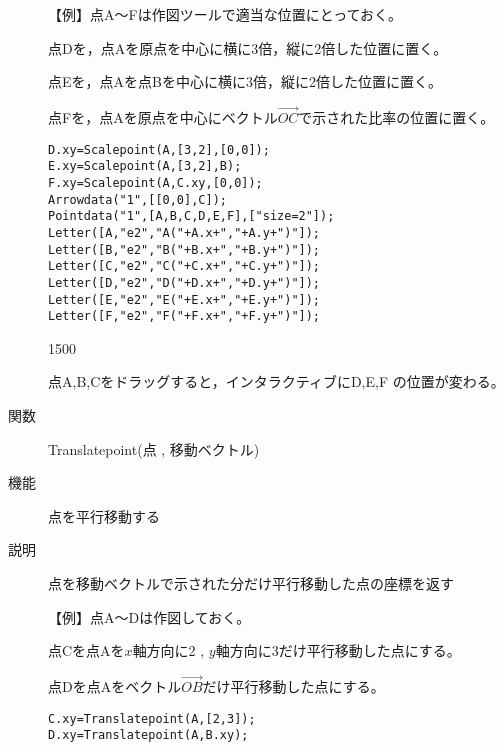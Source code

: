 \documentclass[papersize,a4paper,10pt,uplatex]{jsarticle}
\begin{document}
\begin{description}
\vspace{3mm}

【例】点A〜Fは作図ツールで適当な位置にとっておく。

点Dを，点Aを原点を中心に横に3倍，縦に2倍した位置に置く。

点Eを，点Aを点Bを中心に横に3倍，縦に2倍した位置に置く。

点Fを，点Aを原点を中心にベクトル$\overrightarrow{OC} $で示された比率の位置に置く。
\vspace{-2mm}

\begin{verbatim}
D.xy=Scalepoint(A,[3,2],[0,0]);
E.xy=Scalepoint(A,[3,2],B);
F.xy=Scalepoint(A,C.xy,[0,0]);
Arrowdata("1",[[0,0],C]);
Pointdata("1",[A,B,C,D,E,F],["size=2"]);
Letter([A,"e2","A("+A.x+","+A.y+")"]);
Letter([B,"e2","B("+B.x+","+B.y+")"]);
Letter([C,"e2","C("+C.x+","+C.y+")"]);
Letter([D,"e2","D("+D.x+","+D.y+")"]);
Letter([E,"e2","E("+E.x+","+E.y+")"]);
Letter([F,"e2","F("+F.x+","+F.y+")"]);
\end{verbatim}
\vspace{\baselineskip}

\begin{layer}{150}{0}
\end{layer}

\vspace{40mm}

点A,B,Cをドラッグすると，インタラクティブにD,E,F の位置が変わる。

\vspace{\baselineskip}
\hypertarget{translatepoint}{}
\item[関数]Translatepoint(点 , 移動ベクトル)
\item[機能]点を平行移動する
\item[説明]点を移動ベクトルで示された分だけ平行移動した点の座標を返す

\vspace{\baselineskip}
【例】点A〜Dは作図しておく。

点Cを点Aを$x$軸方向に2 , $y$軸方向に3だけ平行移動した点にする。

点Dを点Aをベクトル$\overrightarrow{OB} $だけ平行移動した点にする。
\begin{verbatim}
C.xy=Translatepoint(A,[2,3]);
D.xy=Translatepoint(A,B.xy);
\end{verbatim}


\end{description}
\end{document}
